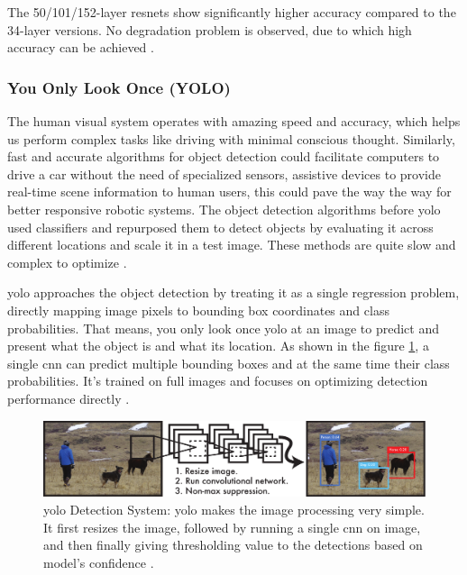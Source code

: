 The 50/101/152-layer \glspl{resnet} show significantly higher accuracy compared to the 34-layer versions. No degradation problem is observed, due to which high accuracy can be achieved \cite{he2016deep}.

\subsubsection{You Only Look Once (YOLO)}
\label{subsec:yolo}

The human visual system operates with amazing speed and accuracy, which helps us perform complex tasks like driving with minimal conscious thought. Similarly, fast and accurate algorithms for object detection could facilitate computers to drive a car without the need of specialized sensors, assistive devices to provide real-time scene information to human users, this could pave the way the way for better responsive robotic systems. The object detection algorithms before \gls{yolo} used classifiers and repurposed them to detect objects by evaluating it across different locations and scale it in a test image. These methods are quite slow and complex to optimize \cite{redmon2016you}.

\gls{yolo} approaches the object detection by treating it as a single regression problem, directly mapping image pixels to bounding box coordinates and class probabilities. That means, you only look once \gls{yolo} at an image to predict and present what the object is and what its location. As shown in the figure \ref{fig:yolo system}, a single \gls{cnn} can predict multiple bounding boxes and at the same time their class probabilities. It's trained on full images and focuses on optimizing detection performance directly \cite{redmon2016you}.

\begin{figure}[H]
    \centering
    \includegraphics[width=1\linewidth]{Rohit_Master_Thesis//Images/yolo_system.pdf}
    \caption{\gls{yolo} Detection System: \gls{yolo} makes the image processing very simple. It first resizes the image, followed by running a single \gls{cnn} on image, and then finally giving thresholding value to the detections based on model's confidence \cite{redmon2016you}.}
    \label{fig:yolo system}
\end{figure}


